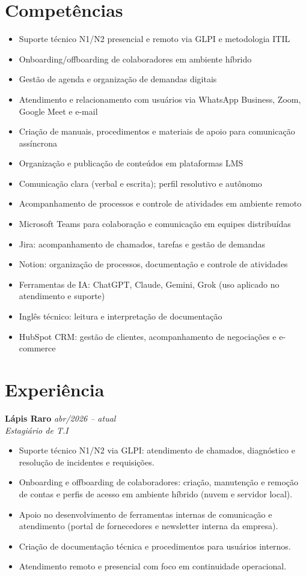 \documentclass[11pt,a4paper]{article}
\begin{document}
\section{Competências}
\begin{itemize}
  \item Suporte técnico N1/N2 presencial e remoto via GLPI e metodologia ITIL
  \item Onboarding/offboarding de colaboradores em ambiente híbrido
  \item Gestão de agenda e organização de demandas digitais
  \item Atendimento e relacionamento com usuários via WhatsApp Business, Zoom, Google Meet e e-mail
  \item Criação de manuais, procedimentos e materiais de apoio para comunicação assíncrona
  \item Organização e publicação de conteúdos em plataformas LMS
  \item Comunicação clara (verbal e escrita); perfil resolutivo e autônomo
  \item Acompanhamento de processos e controle de atividades em ambiente remoto
  \item Microsoft Teams para colaboração e comunicação em equipes distribuídas
  \item Jira: acompanhamento de chamados, tarefas e gestão de demandas
  \item Notion: organização de processos, documentação e controle de atividades
  \item Ferramentas de IA: ChatGPT, Claude, Gemini, Grok (uso aplicado no atendimento e suporte)
  \item Inglês técnico: leitura e interpretação de documentação
  \item HubSpot CRM: gestão de clientes, acompanhamento de negociações e e-commerce
\end{itemize}

\section{Experiência}

\textbf{Lápis Raro} \hfill \textit{abr/2026 -- atual}\\
\textit{Estagiário de T.I}
\begin{itemize}
  \item Suporte técnico N1/N2 via GLPI: atendimento de chamados, diagnóstico e resolução de
        incidentes e requisições.
  \item Onboarding e offboarding de colaboradores: criação, manutenção e remoção de contas e
        perfis de acesso em ambiente híbrido (nuvem e servidor local).
  \item Apoio no desenvolvimento de ferramentas internas de comunicação e atendimento (portal de
        fornecedores e newsletter interna da empresa).
  \item Criação de documentação técnica e procedimentos para usuários internos.
  \item Atendimento remoto e presencial com foco em continuidade operacional.
\end{itemize}
\end{document}
